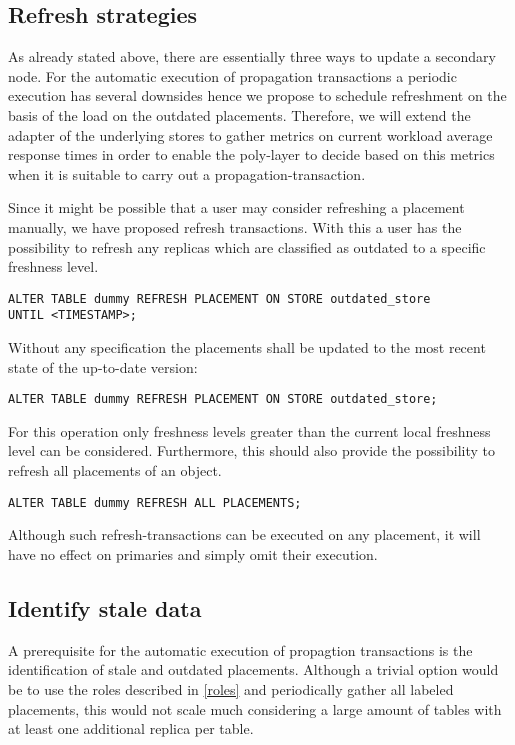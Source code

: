 \subsection{Refresh strategies}
As already stated above, there are essentially three ways to update a secondary node. 
For the automatic execution of propagation transactions a periodic execution has several downsides hence we propose to schedule
refreshment on the basis of the load on the outdated placements. Therefore, we will extend the adapter of the underlying stores to gather metrics on current workload
average response times in order to enable the poly-layer to decide based on this metrics when it is suitable to carry out a propagation-transaction.


Since it might be possible that a user may consider refreshing a placement manually, we have proposed refresh transactions. With this a user has the possibility to refresh
any replicas which are classified as outdated to a specific freshness level.
\begin{verbatim}
ALTER TABLE dummy REFRESH PLACEMENT ON STORE outdated_store 
UNTIL <TIMESTAMP>;
\end{verbatim}
Without any specification the placements shall be updated to the most recent state of the up-to-date version:
\begin{verbatim}
ALTER TABLE dummy REFRESH PLACEMENT ON STORE outdated_store;
\end{verbatim}

For this operation only freshness levels greater than the current local freshness level can be considered.
Furthermore, this should also provide the possibility to refresh all placements of an object.
\begin{verbatim}
ALTER TABLE dummy REFRESH ALL PLACEMENTS;
\end{verbatim}

Although such refresh-transactions can be executed on any placement, it will have no effect on primaries and simply omit their execution. 




\subsection{Identify stale data}
\label{stale}

A prerequisite for the automatic execution of propagtion transactions is the identification of stale and outdated placements.
Although a trivial option would be to use the roles described in \ref{roles} and periodically gather all labeled placements, this would not scale much
considering a large amount of tables with at least one additional replica per table.\\

